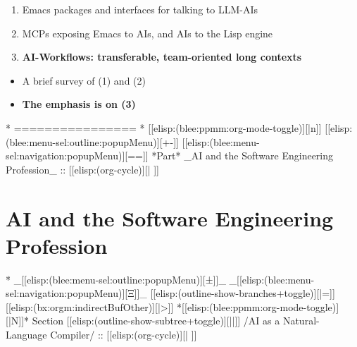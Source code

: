 \begin{whenOrg}
\begin{verblatex}
\begin{frame}[fragile,plain,label=scopeOfTalk]
  \begin{enumerate}
  \item \color{black} Emacs packages and interfaces for talking to LLM-AIs
  \item MCPs exposing Emacs to AIs, and AIs to the Lisp engine
  \item \color{violet} \textbf{AI-Workflows: transferable, team-oriented long contexts}
  \end{enumerate}

  \vspace{0.1in}
  \color{black}
  \begin{itemize}
  \item A brief survey of (1) and (2)
  \item \color{violet} \textbf{The emphasis is on (3)}
  \end{itemize}


\end{frame}
\end{verblatex}



\begin{whenOrg}
*      ================
*  [[elisp:(blee:ppmm:org-mode-toggle)][|n]] [[elisp:(blee:menu-sel:outline:popupMenu)][+-]] [[elisp:(blee:menu-sel:navigation:popupMenu)][==]]  *Part*   _AI and the Software Engineering Profession_ ::  [[elisp:(org-cycle)][| ]]
\end{whenOrg}

\newpage
\part{AI and the Software Engineering Profession}

\begin{whenOrg}
*  _[[elisp:(blee:menu-sel:outline:popupMenu)][±]]_ _[[elisp:(blee:menu-sel:navigation:popupMenu)][Ξ]]_ [[elisp:(outline-show-branches+toggle)][|=]] [[elisp:(bx:orgm:indirectBufOther)][|>]] *[[elisp:(blee:ppmm:org-mode-toggle)][|N]]*  Section    [[elisp:(outline-show-subtree+toggle)][||]]   /AI as a Natural-Language Compiler/ ::  [[elisp:(org-cycle)][| ]]
\end{whenOrg}


\end{whenOrg}
